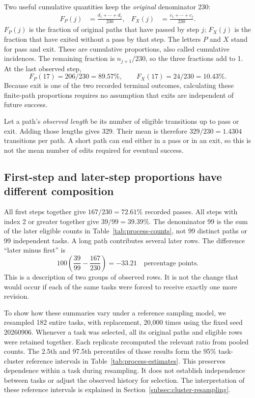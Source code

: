 Two useful cumulative quantities keep the \emph{original} denominator 230:
\begin{align}
 F_P(j)&=\frac{d_1+\cdots+d_j}{230},
 &F_X(j)&=\frac{c_1+\cdots+c_j}{230}.
 \label{eq:finite-incidences}
\end{align}
$F_P(j)$ is the fraction of original paths that have passed by step $j$; $F_X(j)$ is the fraction that have exited without a pass by that step. The letters $P$ and $X$ stand for pass and exit. These are cumulative proportions, also called cumulative incidences. The remaining fraction is $n_{j+1}/230$, so the three fractions add to 1. At the last observed step,
\[
 F_P(17)=206/230=89.57\%,\qquad
 F_X(17)=24/230=10.43\%.
\]
Because exit is one of the two recorded terminal outcomes, calculating these finite-path proportions requires no assumption that exits are independent of future success.

Let a path's \emph{observed length} be its number of eligible transitions up to pass or exit. Adding those lengths gives 329. Their mean is therefore $329/230=1.4304$ transitions per path. A short path can end either in a pass or in an exit, so this is not the mean number of edits required for eventual success.

\subsection{First-step and later-step proportions have different composition}
\label{subsec:first-later}
All first steps together give $167/230=72.61\%$ recorded passes. All steps with index 2 or greater together give $39/99=39.39\%$. The denominator 99 is the sum of the later eligible counts in Table~\ref{tab:process-counts}, not 99 distinct paths or 99 independent tasks. A long path contributes several later rows. The difference ``later minus first'' is
\[
100\left(\frac{39}{99}-\frac{167}{230}\right)=-33.21
\quad\text{percentage points}.
\]
This is a description of two groups of observed rows. It is not the change that would occur if each of the same tasks were forced to receive exactly one more revision.

To show how these summaries vary under a reference sampling model, we resampled 182 entire tasks, with replacement, 20,000 times using the fixed seed 20260906. Whenever a task was selected, all its original paths and eligible rows were retained together. Each replicate recomputed the relevant ratio from pooled counts. The 2.5th and 97.5th percentiles of those results form the 95\% task-cluster reference intervals in Table~\ref{tab:process-estimates}. This preserves dependence within a task during resampling. It does not establish independence between tasks or adjust the observed history for selection. The interpretation of these reference intervals is explained in Section~\ref{subsec:cluster-resampling}.

